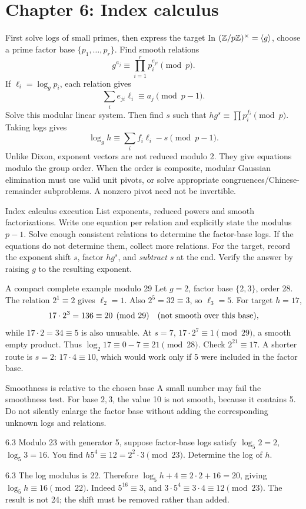 \documentclass[11pt,a4paper]{article}
\begin{document}
\section{Chapter 6: Index calculus}
\begin{concept}{First solve logs of small primes, then express the target}
In \((\mathbb Z/p\mathbb Z)^\times=\langle g\rangle\), choose a prime factor base \(\{p_1,\ldots,p_r\}\). Find smooth relations
\[g^{a_j}\equiv\prod_{i=1}^r p_i^{e_{ji}}\pmod p.\]
If \(\ell_i=\log_g p_i\), each relation gives
\[\sum_i e_{ji}\ell_i\equiv a_j\pmod{p-1}.\]
Solve this modular linear system. Then find \(s\) such that \(hg^s\equiv\prod p_i^{f_i}\pmod p\). Taking logs gives
\[\boxed{\log_g h\equiv\sum_i f_i\ell_i-s\pmod{p-1}.}\]
Unlike Dixon, exponent vectors are not reduced modulo 2. They give equations modulo the group order. When the order is composite, modular Gaussian elimination must use valid unit pivots, or solve appropriate congruences/Chinese-remainder subproblems. A nonzero pivot need not be invertible.
\end{concept}
\begin{method}{Index calculus execution}
List exponents, reduced powers and smooth factorizations. Write one equation per relation and explicitly state the modulus \(p-1\). Solve enough consistent relations to determine the factor-base logs. If the equations do not determine them, collect more relations. For the target, record the exponent shift \(s\), factor \(hg^s\), and \emph{subtract} \(s\) at the end. Verify the answer by raising \(g\) to the resulting exponent.
\end{method}
\begin{example}{A compact complete example modulo 29}
Let \(g=2\), factor base \(\{2,3\}\), order 28. The relation \(2^1\equiv2\) gives \(\ell_2=1\). Also \(2^5=32\equiv3\), so \(\ell_3=5\). For target \(h=17\),
\[17\cdot2^3=136\equiv20\pmod{29}\quad\hbox{(not smooth over this base)},\]
while \(17\cdot2=34\equiv5\) is also unusable. At \(s=7\), \(17\cdot2^7\equiv1\pmod{29}\), a smooth empty product. Thus \(\log_2 17\equiv0-7\equiv21\pmod{28}\). Check \(2^{21}\equiv17\). A shorter route is \(s=2\): \(17\cdot4\equiv10\), which would work only if 5 were included in the factor base.
\end{example}
\begin{tip}{Smoothness is relative to the chosen base}
A small number may fail the smoothness test. For base \(2,3\), the value 10 is not smooth, because it contains 5. Do not silently enlarge the factor base without adding the corresponding unknown logs and relations.
\end{tip}
\begin{question}{6.3}
Modulo 23 with generator 5, suppose factor-base logs satisfy \(\log_5 2=2\), \(\log_5 3=16\). You find \(h5^4\equiv12=2^2\cdot3\pmod{23}\). Determine the log of \(h\).
\end{question}
\begin{answer}{6.3}
The log modulus is 22. Therefore \(\log_5h+4\equiv2\cdot2+16=20\), giving \(\log_5h\equiv16\pmod{22}\). Indeed \(5^{16}\equiv3\), and \(3\cdot5^4\equiv3\cdot4\equiv12\pmod{23}\). The result is not 24; the shift must be removed rather than added.
\end{answer}
\end{document}
